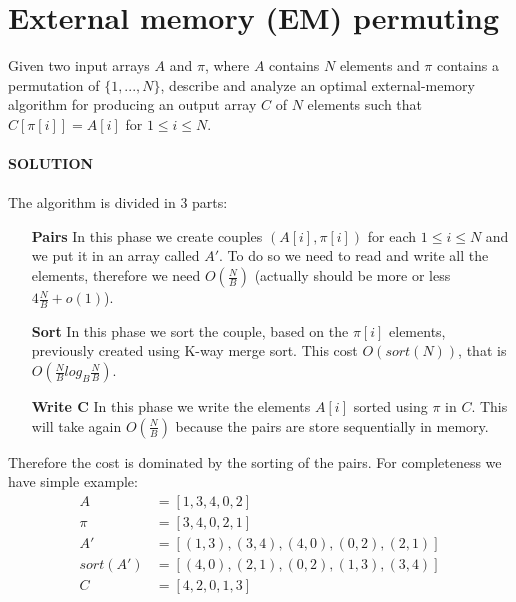 \documentclass[a4paper]{article}
\begin{document}
\section*{External memory (EM) permuting}
Given two input arrays $A$ and $\pi$, where $A$ contains
$N$ elements and $\pi$ contains a permutation of $\{1, . . . , N\}$, describe and analyze an
optimal external-memory algorithm for producing an output array $C$ of $N$ elements
such that $C[\pi[i]] = A[i]$ for $1 \leq i \leq N$.
\\
\\
\textbf{SOLUTION}
\\
\\
The algorithm is divided in 3 parts:
\begin{itemize}
\item[\textbf{Pairs}] In this phase we create couples $(A[i],\pi[i])$ for each $1 \leq i \leq N$ and we put it in an array called $A'$. To do so we need to read and write all the elements, therefore we need $O(\frac{N}{B})$ (actually should be more or less $4\frac{N}{B}+ o(1)$). 
\item[\textbf{Sort}] In this phase we sort the couple, based on the $\pi[i]$ elements, previously created using K-way merge sort. This cost $O(sort(N))$, that is $O(\frac{N}{B} log_B \frac{N}{B})$.
\item[\textbf{Write C}] In this phase we write the elements $A[i]$ sorted using $\pi$ in $C$. This will take again $O(\frac{N}{B})$ because the pairs are store sequentially in memory.   
\end{itemize}

Therefore the cost is dominated by the sorting of the pairs. For completeness we have simple example:
\begin{align*}
A   &= [1,3,4,0,2]\\
\pi &= [3,4,0,2,1]\\
A'  &= [(1,3),(3,4),(4,0),(0,2),(2,1)]\\
sort(A') &= [(4,0),(2,1),(0,2),(1,3),(3,4)]\\
C &= [4,2,0,1,3]
\end{align*}
\end{document}
